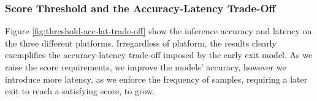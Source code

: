 \subsubsection{Score Threshold and the Accuracy-Latency Trade-Off}

Figure \ref{fig:threshold-acc-lat-trade-off} show the inference accuracy and latency on the three different platforms. Irregardless of platform, the results clearly exemplifies the accuracy-latency trade-off imposed by the early exit model. As we raise the score requirements, we improve the models' accuracy, however we introduce more latency, as we enforce the frequency of samples, requiring a later exit to reach a satisfying score, to grow. 



